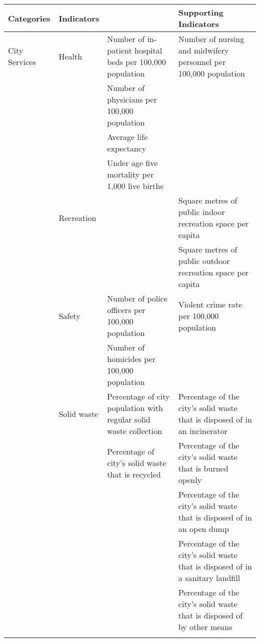 \begin{landscape}
\begin{table}[th]
\begin{center}
\begin{tabular}{ >{\raggedright\arraybackslash}p{} >{\raggedright\arraybackslash}p{} >{\raggedright\arraybackslash}p{} >{\raggedright\arraybackslash}p{} } 
\hline
Categories & Indicators &  & Supporting Indicators \\
\hline
City Services & Health & Number of in-patient hospital beds per 100,000 population & Number of nursing and midwifery personnel per 100,000 population \\
  &  & Number of physicians per 100,000 population &  \\
  &  & Average life expectancy &  \\
  &  & Under age five mortality per 1,000 live births \linebreak &  \\
  & Recreation &  & Square metres of public indoor recreation space per capita \\
  &  &  & Square metres of public outdoor recreation space per capita \linebreak \\
  & Safety & Number of police officers per 100,000 population & Violent crime rate per 100,000 population \\
  &  & Number of homicides per 100,000 population \linebreak &  \\
  & Solid waste & Percentage of city population with regular solid waste collection & Percentage of the city’s solid waste that is disposed of in an incinerator \\
  &  & Percentage of city’s solid waste that is recycled & Percentage of the city’s solid waste that is burned openly \\
  &  &  & Percentage of the city’s solid waste that is disposed of in an open dump \\
  &  &  & Percentage of the city’s solid waste that is disposed of in a sanitary landfill \\
  &  &  & Percentage of the city’s solid waste that is disposed of by other means \\
\hline
\label{tbl:globalCityIndicatorsFacility1}
\end{tabular}
\end{center}
\end{table}


\end{landscape}
